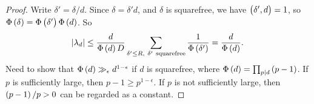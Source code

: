 \begin{proof}
Write $ \delta' = \delta / d $. Since $ \delta = \delta'd $, and $ \delta $ is squarefree, we have $ \br{\delta', d} = 1 $, so $ \Phi\br{\delta} = \Phi\br{\delta'}\Phi\br{d} $. So
$$ \abs{\lambda_d} \le \dfrac{d}{\Phi\br{d}D}\sum_{\delta' \le R, \ \delta' \ \text{squarefree}} \dfrac{1}{\Phi\br{\delta'}} = \dfrac{d}{\Phi\br{d}}. $$
Need to show that $ \Phi\br{d} \gg_\epsilon d^{1 - \epsilon} $ if $ d $ is squarefree, where $ \Phi\br{d} = \prod_{p \mid d} \br{p - 1} $. If $ p $ is sufficiently large, then $ p - 1 \ge p^{1 - \epsilon} $. If $ p $ is not sufficiently large, then $ \br{p - 1} / p > 0 $ can be regarded as a constant.
\end{proof}

